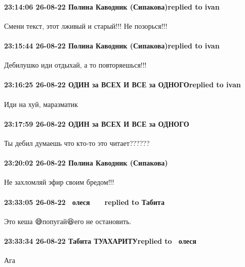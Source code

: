 
 
 
 
 

\paragraph{23:14:06 26-08-22 Полина Каводник (Сипакова)replied to ivan}

Смени текст, этот лживый и старый!!! Не позорься!!!

\paragraph{23:15:44 26-08-22 Полина Каводник (Сипакова)replied to ivan}

Дебилушко иди отдыхай, а то повторяешься!!!

\paragraph{23:16:25 26-08-22 ОДИН за ВСЕХ И ВСЕ за ОДНОГОreplied to ivan}

Иди на хуй, маразматик

\paragraph{23:17:59 26-08-22 ОДИН за ВСЕХ И ВСЕ за ОДНОГО}
Ты дебил думаешь что кто-то это читает??????

\paragraph{23:20:02 26-08-22 Полина Каводник (Сипакова)}
Не захломляй эфир своим бредом!!!

\paragraph{23:33:05 26-08-22 🌹🌹олеся🌹🌹🌹 💋💋💋replied to Табита}
Это кеша 😅попугай😆его не остановить.

\paragraph{23:33:34 26-08-22 Табита ТУАХАРИТУreplied to 🌹🌹олеся🌹🌹🌹}
Ага
